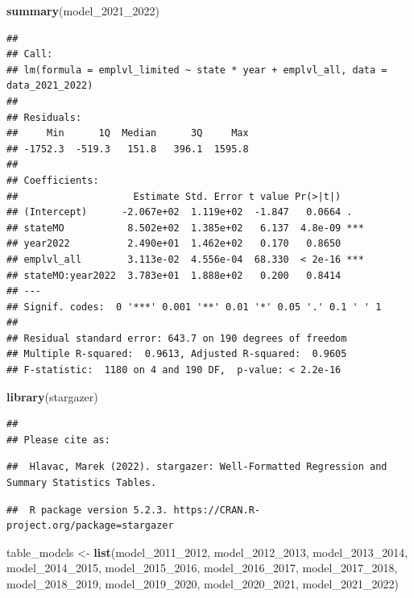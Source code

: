 \documentclass[
]{article}
\newenvironment{Shaded}{\begin{snugshade}}{\end{snugshade}}
\newcommand{\FunctionTok}[1]{\textcolor[rgb]{0.13,0.29,0.53}{\textbf{#1}}}
\newcommand{\NormalTok}[1]{#1}
\newcommand{\OtherTok}[1]{\textcolor[rgb]{0.56,0.35,0.01}{#1}}
\begin{document}
\begin{Shaded}
\begin{Highlighting}[]
\FunctionTok{summary}\NormalTok{(model\_2021\_2022)}
\end{Highlighting}
\end{Shaded}

\begin{verbatim}
## 
## Call:
## lm(formula = emplvl_limited ~ state * year + emplvl_all, data = data_2021_2022)
## 
## Residuals:
##     Min      1Q  Median      3Q     Max 
## -1752.3  -519.3   151.8   396.1  1595.8 
## 
## Coefficients:
##                    Estimate Std. Error t value Pr(>|t|)    
## (Intercept)      -2.067e+02  1.119e+02  -1.847   0.0664 .  
## stateMO           8.502e+02  1.385e+02   6.137  4.8e-09 ***
## year2022          2.490e+01  1.462e+02   0.170   0.8650    
## emplvl_all        3.113e-02  4.556e-04  68.330  < 2e-16 ***
## stateMO:year2022  3.783e+01  1.888e+02   0.200   0.8414    
## ---
## Signif. codes:  0 '***' 0.001 '**' 0.01 '*' 0.05 '.' 0.1 ' ' 1
## 
## Residual standard error: 643.7 on 190 degrees of freedom
## Multiple R-squared:  0.9613, Adjusted R-squared:  0.9605 
## F-statistic:  1180 on 4 and 190 DF,  p-value: < 2.2e-16
\end{verbatim}

\begin{Shaded}
\begin{Highlighting}[]
\FunctionTok{library}\NormalTok{(stargazer)}
\end{Highlighting}
\end{Shaded}

\begin{verbatim}
## 
## Please cite as:
\end{verbatim}

\begin{verbatim}
##  Hlavac, Marek (2022). stargazer: Well-Formatted Regression and Summary Statistics Tables.
\end{verbatim}

\begin{verbatim}
##  R package version 5.2.3. https://CRAN.R-project.org/package=stargazer
\end{verbatim}

\begin{Shaded}
\begin{Highlighting}[]
\NormalTok{table\_models }\OtherTok{\textless{}{-}} \FunctionTok{list}\NormalTok{(model\_2011\_2012, model\_2012\_2013, model\_2013\_2014, model\_2014\_2015, model\_2015\_2016, model\_2016\_2017, model\_2017\_2018, model\_2018\_2019, model\_2019\_2020, model\_2020\_2021, model\_2021\_2022)}
\end{Highlighting}
\end{Shaded}
\end{document}
